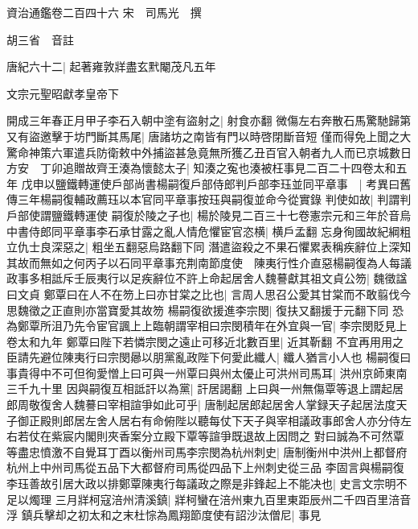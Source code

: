 資治通鑑卷二百四十六
宋　司馬光　撰

胡三省　音註

唐紀六十二|{
	起著雍敦牂盡玄黓閹茂凡五年}


文宗元聖昭獻孝皇帝下

開成三年春正月甲子李石入朝中塗有盜射之|{
	射食亦翻}
微傷左右奔散石馬驚馳歸第又有盜邀擊于坊門斷其馬尾|{
	唐諸坊之南皆有門以時啓閉斷音短}
僅而得免上聞之大驚命神策六軍遣兵防衛敕中外捕盜甚急竟無所獲乙丑百官入朝者九人而已京城數日方安　丁卯追贈故齊王湊為懷懿太子|{
	知湊之寃也湊被枉事見二百二十四卷太和五年}
戊申以鹽鐵轉運使戶部尚書楊嗣復戶部侍郎判戶部李珏並同平章事　|{
	考異曰舊傳三年楊嗣復輔政薦珏以本官同平章事按珏與嗣復並命今從實錄}
判使如故|{
	判謂判戶部使謂鹽鐵轉運使}
嗣復於陵之子也|{
	楊於陵見二百三十七卷憲宗元和三年於音烏}
中書侍郎同平章事李石承甘露之亂人情危懼宦官恣横|{
	横戶孟翻}
忘身徇國故紀綱粗立仇士良深惡之|{
	粗坐五翻惡烏路翻下同}
潛遣盜殺之不果石懼累表稱疾辭位上深知其故而無如之何丙子以石同平章事充荆南節度使　陳夷行性介直惡楊嗣復為人每議政事多相詆斥壬辰夷行以足疾辭位不許上命起居舍人魏謩獻其祖文貞公笏|{
	魏徵諡曰文貞}
鄭覃曰在人不在笏上曰亦甘棠之比也|{
	言周人思召公愛其甘棠而不敢翦伐今思魏徵之正直則亦當寶愛其故笏}
楊嗣復欲援進李宗閔|{
	復扶又翻援于元翻下同}
恐為鄭覃所沮乃先令宦官諷上上臨朝謂宰相曰宗閔積年在外宜與一官|{
	李宗閔貶見上卷太和九年}
鄭覃曰陛下若憐宗閔之遠止可移近北數百里|{
	近其靳翻}
不宜再用用之臣請先避位陳夷行曰宗閔曏以朋黨亂政陛下何愛此纖人|{
	纖人猶言小人也}
楊嗣復曰事貴得中不可但徇愛憎上曰可與一州覃曰與州太優止可洪州司馬耳|{
	洪州京師東南三千九十里}
因與嗣復互相詆訐以為黨|{
	訐居謁翻}
上曰與一州無傷覃等退上謂起居郎周敬復舍人魏謩曰宰相諠爭如此可乎|{
	唐制起居郎起居舍人掌録天子起居法度天子御正殿則郎居左舍人居右有命俯陛以聽每仗下天子與宰相議政事郎舍人亦分侍左右若仗在紫宸内閣則夾香案分立殿下覃等諠爭既退故上因問之}
對曰誠為不可然覃等盡忠憤激不自覺耳丁酉以衡州司馬李宗閔為杭州刺史|{
	唐制衡州中洪州上都督府杭州上中州司馬從五品下大都督府司馬從四品下上州刺史從三品}
李固言與楊嗣復李珏善故引居大政以排鄭覃陳夷行每議政之際是非鋒起上不能决也|{
	史言文宗明不足以燭理}
三月牂柯寇涪州清溪鎮|{
	牂柯蠻在涪州東九百里東距辰州二千四百里涪音浮}
鎮兵擊却之初太和之末杜悰為鳳翔節度使有詔沙汰僧尼|{
	事見}



